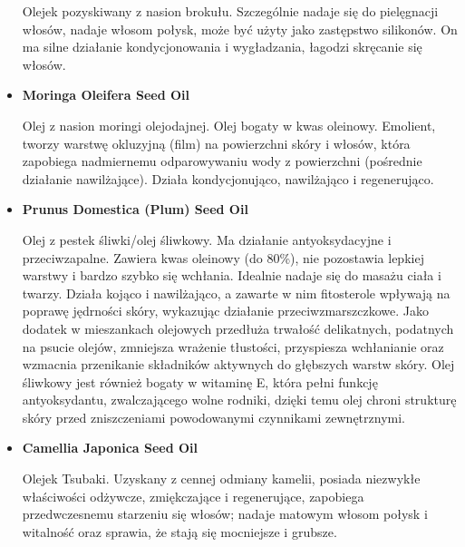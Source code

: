 \begin{itemize}
Olejek pozyskiwany z nasion brokułu. Szczególnie nadaje się do pielęgnacji włosów, nadaje włosom połysk, może być użyty jako zastępstwo silikonów. On ma silne działanie kondycjonowania i wygładzania, łagodzi skręcanie się włosów.

\item \textbf{Moringa Oleifera Seed Oil}

Olej z nasion moringi olejodajnej. Olej bogaty w kwas oleinowy. Emolient, tworzy warstwę okluzyjną (film) na powierzchni skóry i włosów, która zapobiega nadmiernemu odparowywaniu wody z powierzchni (pośrednie działanie nawilżające). Działa kondycjonująco, nawilżająco i regenerująco.

\item \textbf{Prunus Domestica (Plum) Seed Oil}

Olej z pestek śliwki/olej śliwkowy. Ma działanie antyoksydacyjne i przeciwzapalne. Zawiera kwas oleinowy (do 80\%), nie pozostawia lepkiej warstwy i bardzo szybko się wchłania. Idealnie nadaje się do masażu ciała i twarzy. Działa kojąco i nawilżająco, a zawarte w nim fitosterole wpływają na poprawę jędrności skóry, wykazując działanie przeciwzmarszczkowe. Jako dodatek w mieszankach olejowych przedłuża trwałość delikatnych, podatnych na psucie olejów, zmniejsza wrażenie tłustości, przyspiesza wchłanianie oraz wzmacnia przenikanie składników aktywnych do głębszych warstw skóry. Olej śliwkowy jest również bogaty w witaminę E, która pełni funkcję antyoksydantu, zwalczającego wolne rodniki, dzięki temu olej chroni strukturę skóry przed zniszczeniami powodowanymi czynnikami zewnętrznymi.

\item \textbf{Camellia Japonica Seed Oil}

Olejek Tsubaki. Uzyskany z cennej odmiany kamelii, posiada niezwykłe właściwości odżywcze, zmiękczające i regenerujące, zapobiega przedwczesnemu starzeniu się włosów; nadaje matowym włosom połysk i witalność oraz sprawia, że stają się mocniejsze i grubsze.





\end{itemize}
